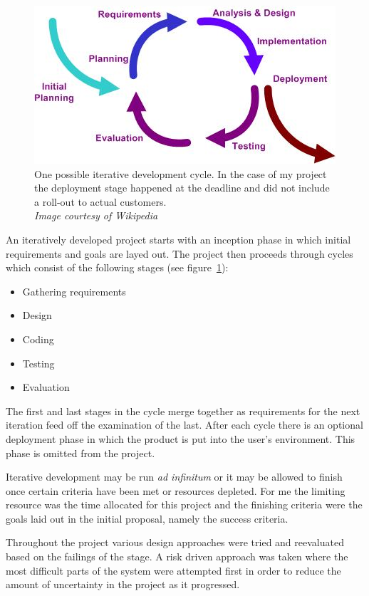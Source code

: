 \documentclass[12pt,a4paper,oneside]{scrbook}
\begin{document}
\begin{figure}
  \centering
  \includegraphics{./figs/Iterative_development_model_V2.jpg}
  \caption{One possible iterative development cycle. In the case of my project
    the deployment stage happened at the deadline and did not include a roll-out
    to actual customers. \\ \emph{Image courtesy of Wikipedia}}
  \label{fig:iterative}
\end{figure}

An iteratively developed project starts with an inception phase in which initial
requirements and goals are layed out. The project then proceeds through cycles
which consist of the following stages (see figure~\ref{fig:iterative}):

\begin{itemize}
\item
  Gathering requirements
\item
  Design
\item
  Coding
\item
  Testing
\item
  Evaluation
\end{itemize}

The first and last stages in the cycle merge together as requirements for the
next iteration feed off the examination of the last. After each cycle there is an
optional deployment phase in which the product is put into the user's
environment. This phase is omitted from the project.

Iterative development may be run \emph{ad infinitum} or it may be allowed to
finish once certain criteria have been met or resources depleted. For me the
limiting resource was the time allocated for this project and the finishing
criteria were the goals laid out in the initial proposal, namely the success
criteria.

Throughout the project various design approaches were tried and reevaluated
based on the failings of the stage. A risk driven approach was taken where the most
difficult parts of the system were attempted first in order to reduce the amount
of uncertainty in the project as it progressed.
\end{document}
